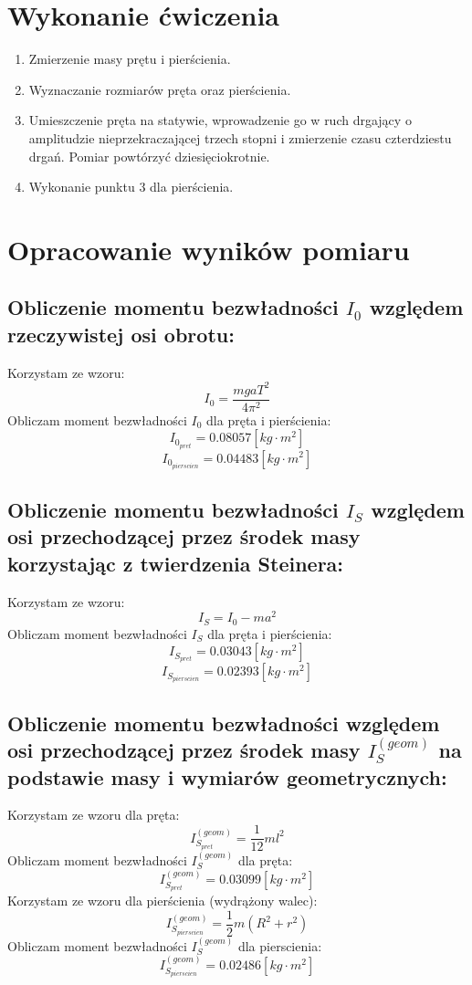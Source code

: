 \documentclass{article}
\begin{document}
	\section{Wykonanie ćwiczenia}
	\begin{enumerate}
		\item Zmierzenie masy prętu i pierścienia.
		\item Wyznaczanie rozmiarów pręta oraz pierścienia.
		\item Umieszczenie pręta na statywie, wprowadzenie go w ruch drgający o amplitudzie nieprzekraczającej trzech stopni i zmierzenie czasu czterdziestu drgań. Pomiar powtórzyć dziesięciokrotnie.
		\item Wykonanie punktu 3 dla pierścienia.
	\end{enumerate}
		\newpage
	\section{Opracowanie wyników pomiaru}
	
	\subsection{Obliczenie momentu bezwładności $I_{0}$ względem rzeczywistej osi obrotu:}
	Korzystam ze wzoru:
	\[
	    I_{0}=\frac{mgaT^{2}}{4\pi^{2}}
	\]
	Obliczam moment bezwładności $I_{0}$ dla pręta i pierścienia:
	\[
	    I_{0_{pret}}=0.08057    [kg\cdot m^2]
	\]
	\[
	    I_{0_{pierscien}}=0.04483   [kg\cdot m^2]
	\]
	
	\subsection{Obliczenie momentu bezwładności $I_{S}$ względem osi przechodzącej przez środek masy korzystając z twierdzenia Steinera:} 
    Korzystam ze wzoru:
	\[
	    I_{S}=I_{0}-ma^{2}
	\]
	Obliczam moment bezwładności $I_{S}$ dla pręta i pierścienia:
	\[
	    I_{S_{pret}}=0.03043    [kg\cdot m^2]
	\]
	\[
	    I_{S_{pierscien}}=0.02393   [kg\cdot m^2]
	\]
	
	\subsection{Obliczenie momentu bezwładności względem osi przechodzącej przez środek masy $I_{S}^{(geom)}$ na podstawie masy i wymiarów geometrycznych:}
	Korzystam ze wzoru dla pręta:
	\[
	    I_{S_{pret}}^{(geom)}=\frac{1}{12}ml^2
	\]
	Obliczam moment bezwładności $I_{S}^{(geom)}$ dla pręta:
	\[
	    I_{S_{pret}}^{(geom)}=0.03099   [kg\cdot m^2]
	\]
	Korzystam ze wzoru dla pierścienia (wydrążony walec):
	\[
	    I_{S_{pierscien}}^{(geom)}=\frac{1}{2}m(R^2+r^2)
	\]
	Obliczam moment bezwładności $I_{S}^{(geom)}$ dla pierscienia:
	\[
	    I_{S_{pierscien}}^{(geom)}= 0.02486 [kg\cdot m^2]
	\]\pagebreak
\end{document}
